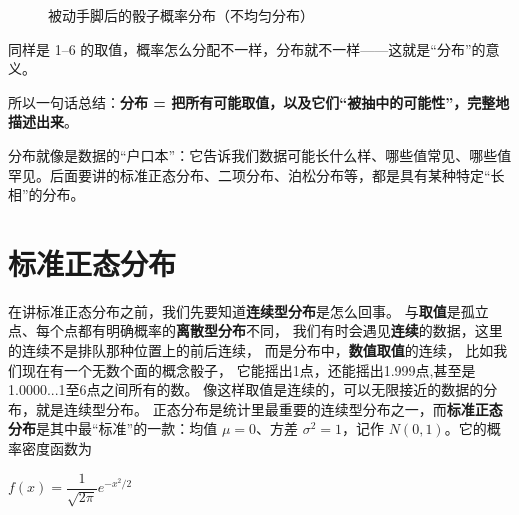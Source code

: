 \documentclass[lang=cn,10pt]{elegantbook}
\begin{document}
\begin{figure}[H]
  \centering
  \caption{被动手脚后的骰子概率分布（不均匀分布）}
\end{figure}

同样是 1--6 的取值，概率怎么分配不一样，分布就不一样——这就是“分布”的意义。

所以一句话总结：\textbf{分布 = 把所有可能取值，以及它们“被抽中的可能性”，完整地描述出来}。

\begin{remark}
分布就像是数据的“户口本”：它告诉我们数据可能长什么样、哪些值常见、哪些值罕见。后面要讲的标准正态分布、二项分布、泊松分布等，都是具有某种特定“长相”的分布。
\end{remark}

\section{标准正态分布}
在讲标准正态分布之前，我们先要知道\textbf{连续型分布}是怎么回事。
与\textbf{取值}是孤立点、每个点都有明确概率的\textbf{离散型分布}不同，
我们有时会遇见\textbf{连续}的数据，这里的连续不是排队那种位置上的前后连续，
而是分布中，\textbf{数值取值}的连续，
比如我们现在有一个无数个面的概念骰子，
它能摇出1点，还能摇出1.999点,甚至是1.0000...1至6点之间所有的数。
像这样取值是连续的，可以无限接近的数据的分布，就是连续型分布。
正态分布是统计里最重要的连续型分布之一，而\textbf{标准正态分布}是其中最“标准”的一款：均值 $\mu=0$、方差 $\sigma^2=1$，记作 $N(0,1)$。它的概率密度函数为
\begin{center}
  $f(x)=\dfrac{1}{\sqrt{2\pi}}e^{-x^2/2}$
\end{center}
\end{document}
